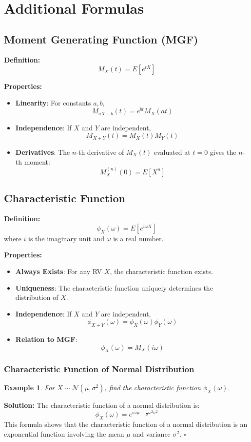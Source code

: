 \documentclass[12pt]{article}
\newtheorem{example}{Example}
\newenvironment{solution}{\noindent\textbf{Solution:}}{\hfill$\square$}
\begin{document}
\section{Additional Formulas}
\subsection{Moment Generating Function (MGF)}
\textbf{Definition:}
\[
M_X(t) = E[e^{tX}]
\]

\textbf{Properties:}
\begin{itemize}
    \item \textbf{Linearity}: For constants \( a, b \), 
    \[
    M_{aX + b}(t) = e^{bt} M_X(at)
    \]
    \item \textbf{Independence}: If \( X \) and \( Y \) are independent, 
    \[
    M_{X+Y}(t) = M_X(t) M_Y(t)
    \]
    \item \textbf{Derivatives}: The \( n \)-th derivative of \( M_X(t) \) evaluated at \( t=0 \) gives the \( n \)-th moment:
    \[
    M_X^{(n)}(0) = E[X^n]
    \]
\end{itemize}

\subsection{Characteristic Function}
\textbf{Definition:}
\[
\phi_X(\omega) = E[e^{i\omega X}]
\]
where \( i \) is the imaginary unit and \( \omega \) is a real number.

\textbf{Properties:}
\begin{itemize}
    \item \textbf{Always Exists}: For any RV \( X \), the characteristic function exists.
    \item \textbf{Uniqueness}: The characteristic function uniquely determines the distribution of \( X \).
    \item \textbf{Independence}: If \( X \) and \( Y \) are independent, 
    \[
    \phi_{X+Y}(\omega) = \phi_X(\omega) \phi_Y(\omega)
    \]
    \item \textbf{Relation to MGF}: 
    \[
    \phi_X(\omega) = M_X(i\omega)
    \]
\end{itemize}

\subsubsection{Characteristic Function of Normal Distribution}
\begin{example}
For \( X \sim \mathcal{N}(\mu, \sigma^2) \), find the characteristic function \( \phi_X(\omega) \).
\end{example}
\begin{solution}
The characteristic function of a normal distribution is:
\[
\phi_X(\omega) = e^{i\omega\mu - \frac{1}{2} \omega^2 \sigma^2}
\]
This formula shows that the characteristic function of a normal distribution is an exponential function involving the mean \( \mu \) and variance \( \sigma^2 \).
\end{solution}
\end{document}

